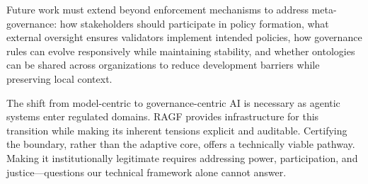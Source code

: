 \documentclass[sigconf,nonacm]{acmart}
\begin{document}
Future work must extend beyond enforcement mechanisms to address meta-governance: how stakeholders should participate in policy formation, what external oversight ensures validators implement intended policies, how governance rules can evolve responsively while maintaining stability, and whether ontologies can be shared across organizations to reduce development barriers while preserving local context.

The shift from model-centric to governance-centric AI is necessary as agentic systems enter regulated domains. RAGF provides infrastructure for this transition while making its inherent tensions explicit and auditable. Certifying the boundary, rather than the adaptive core, offers a technically viable pathway. Making it institutionally legitimate requires addressing power, participation, and justice---questions our technical framework alone cannot answer.
\end{document}

